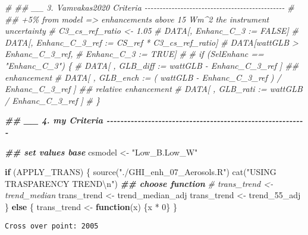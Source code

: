 \documentclass[
  10pt,
  a4paper,oneside]{article}
\newenvironment{Shaded}{\begin{snugshade}}{\end{snugshade}}
\newcommand{\CommentTok}[1]{\textcolor[rgb]{0.56,0.35,0.01}{\textit{#1}}}
\newcommand{\ControlFlowTok}[1]{\textcolor[rgb]{0.13,0.29,0.53}{\textbf{#1}}}
\newcommand{\DecValTok}[1]{\textcolor[rgb]{0.00,0.00,0.81}{#1}}
\newcommand{\DocumentationTok}[1]{\textcolor[rgb]{0.56,0.35,0.01}{\textbf{\textit{#1}}}}
\newcommand{\FunctionTok}[1]{\textcolor[rgb]{0.00,0.00,0.00}{#1}}
\newcommand{\NormalTok}[1]{#1}
\newcommand{\OtherTok}[1]{\textcolor[rgb]{0.56,0.35,0.01}{#1}}
\newcommand{\SpecialCharTok}[1]{\textcolor[rgb]{0.00,0.00,0.00}{#1}}
\newcommand{\StringTok}[1]{\textcolor[rgb]{0.31,0.60,0.02}{#1}}
\begin{document}
\begin{Shaded}
\begin{Highlighting}[]
\CommentTok{\# \#\# \_\_ 3. Vamvakas2020  Criteria  {-}{-}{-}{-}{-}{-}{-}{-}{-}{-}{-}{-}{-}{-}{-}{-}{-}{-}{-}{-}{-}{-}{-}{-}{-}{-}{-}{-}{-}{-}{-}{-}{-}{-}{-}{-}{-}{-}{-}{-}{-}{-}{-}{-}{-}{-}{-}}
\CommentTok{\# \#\# +5\% from model =\textgreater{} enhancements above 15 Wm\^{}2 the instrument uncertainty}
\CommentTok{\# C3\_cs\_ref\_ratio \textless{}{-} 1.05}
\CommentTok{\# DATA[, Enhanc\_C\_3 := FALSE]}
\CommentTok{\# DATA[, Enhanc\_C\_3\_ref := CS\_ref * C3\_cs\_ref\_ratio]}
\CommentTok{\# DATA[wattGLB \textgreater{} Enhanc\_C\_3\_ref,}
\CommentTok{\#      Enhanc\_C\_3 := TRUE]}
\CommentTok{\#}
\CommentTok{\# if (SelEnhanc == "Enhanc\_C\_3") \{}
\CommentTok{\#   DATA[ , GLB\_diff :=   wattGLB {-} Enhanc\_C\_3\_ref                    ] \#\# enhancement}
\CommentTok{\#   DATA[ , GLB\_ench := ( wattGLB {-} Enhanc\_C\_3\_ref ) / Enhanc\_C\_3\_ref ] \#\# relative enhancement}
\CommentTok{\#   DATA[ , GLB\_rati :=   wattGLB / Enhanc\_C\_3\_ref                    ]}
\CommentTok{\# \}}



\DocumentationTok{\#\# \_\_ 4. my Criteria  {-}{-}{-}{-}{-}{-}{-}{-}{-}{-}{-}{-}{-}{-}{-}{-}{-}{-}{-}{-}{-}{-}{-}{-}{-}{-}{-}{-}{-}{-}{-}{-}{-}{-}{-}{-}{-}{-}{-}{-}{-}{-}{-}{-}{-}{-}{-}{-}{-}{-}{-}{-}{-}{-}{-}{-}{-}{-}}

\DocumentationTok{\#\# set values base}
\NormalTok{csmodel }\OtherTok{\textless{}{-}} \StringTok{"Low\_B.Low\_W"}



\ControlFlowTok{if}\NormalTok{ (APPLY\_TRANS) \{}
  \FunctionTok{source}\NormalTok{(}\StringTok{"./GHI\_enh\_07\_Aerosols.R"}\NormalTok{)}
  \FunctionTok{cat}\NormalTok{(}\StringTok{"USING TRASPARENCY TREND}\SpecialCharTok{\textbackslash{}n}\StringTok{"}\NormalTok{)}
  \DocumentationTok{\#\# choose function}
  \CommentTok{\# trans\_trend \textless{}{-} trend\_median}
\NormalTok{  trans\_trend }\OtherTok{\textless{}{-}}\NormalTok{ trend\_median\_adj}
\NormalTok{  trans\_trend }\OtherTok{\textless{}{-}}\NormalTok{ trend\_55\_adj}
\NormalTok{\} }\ControlFlowTok{else}\NormalTok{ \{}
\NormalTok{  trans\_trend }\OtherTok{\textless{}{-}} \ControlFlowTok{function}\NormalTok{(x) \{x }\SpecialCharTok{*} \DecValTok{0}\NormalTok{\}}
\NormalTok{\}}
\end{Highlighting}
\end{Shaded}

\begin{verbatim}
Cross over point: 2005 
\end{verbatim}
\end{document}
